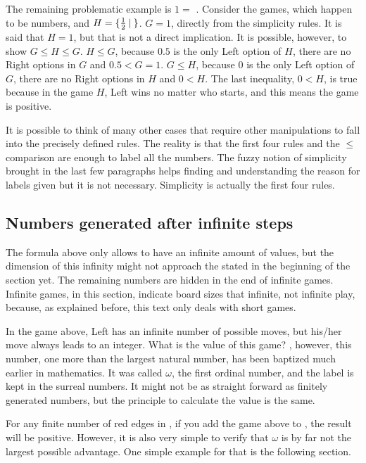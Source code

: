 The remaining problematic example is $1 =$ . Consider the games, which happen to be numbers,  and $H = \mbox{$\{\frac{1}{2}\:|\:\}$}$. $G = 1$, directly from the simplicity rules. It is said that $H = 1$, but that is not a direct implication. It is possible, however, to show $G \leq H \leq G$. $H \leq G$, because $0.5$ is the only Left option of $H$, there are no Right options in $G$ and $0.5 < G = 1$. $G \leq H$, because $0$ is the only Left option of $G$, there are no Right options in $H$ and $0 < H$. The last inequality, $0 < H$, is true because in the game $H$, Left wins no matter who starts, and this means the game is positive.

It is possible to think of many other cases that require other manipulations to fall into the precisely defined rules. The reality is that the first four rules and the $\leq$ comparison are enough to label all the numbers. The fuzzy notion of simplicity brought in the last few paragraphs helps finding and understanding the reason for labels given but it is not necessary. Simplicity is actually the first four rules.

\subsection*{Numbers generated after infinite steps}

The formula above only allows \Gm{} to have an infinite amount of values, but the dimension of this infinity might not approach the stated in the beginning of the section yet. The remaining numbers are hidden in the end of infinite games. Infinite games, in this section, indicate board sizes that infinite, not infinite play, because, as explained before, this text only deals with short games. 



In the game above, Left has an infinite number of possible moves, but his/her move always leads to an integer. What is the value of this game? , however, this number, one more than the largest natural number, has been baptized much earlier in mathematics. It was called $\omega$, the first ordinal number, and the label is kept in the surreal numbers. It might not be as straight forward as finitely generated numbers, but the principle to calculate the value is the same.

For any finite number of red edges in \Gm{}, if you add the game above to \Gm{}, the result will be positive. However, it is also very simple to verify that $\omega$ is by far not the largest possible advantage. One simple  example for that is the following section.

